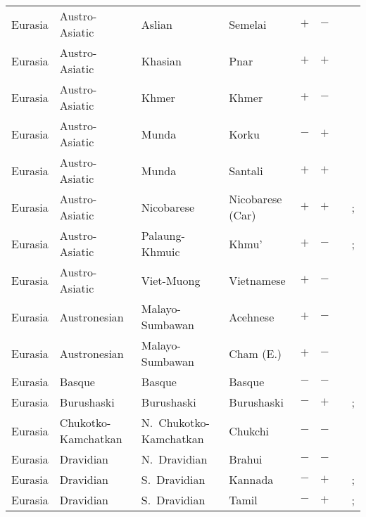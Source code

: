 \begin{landscape}
\begin{longtable}{l>{\raggedright\arraybackslash}p{2.2cm}>{\raggedright}p{2.5cm}>{\raggedright\arraybackslash}p{2.5cm}cc>{\raggedright\arraybackslash}p{3.4cm}>{\raggedright\arraybackslash}p{3.4cm}}
Eurasia & Austro-Asiatic & Aslian & Semelai & $+$ & $-$ & \citealt{Gil2013} & \citealt{Corbett2013}\\
Eurasia & Austro-Asiatic & Khasian & Pnar & $+$ & $+$ & \citealt[124--125, 357--369]{Ring2015} & \citealt[101, 107--108]{Ring2015}\\
Eurasia & Austro-Asiatic & Khmer & Khmer & $+$ & $-$ & \citealt{Gil2013} & \citealt{Corbett2013}\\
Eurasia & Austro-Asiatic & Munda & Korku & $-$ & $+$ & \citealt{Gil2013} & \citealt[passim]{Bhattacharya1976}\\
Eurasia & Austro-Asiatic & Munda & Santali & $+$ & $+$ & \citealt{Gil2013} & \citealt[11--12, 32--33, 39--40, 44--45]{Ghosh2008}\\
Eurasia & Austro-Asiatic & Nicobarese & Nicobarese (Car) & $+$ & $+$ & \citealt{Gil2013} & \citealt{Corbett2013}; \citealt[103--108]{Braine1970}\\
Eurasia & Austro-Asiatic & Palaung-Khmuic & Khmu' & $+$ & $-$ & \citealt{Gil2013} & \citealt{Corbett2013}; \citealt[30, 32--33]{Premsrirat1987}\\
Eurasia & Austro-Asiatic & Viet-Muong & Vietnamese & $+$ & $-$ & \citealt{Gil2013} & \citealt{Corbett2013}\\
Eurasia & Austronesian & Malayo-Sumbawan & Acehnese & $+$ & $-$ & \citealt[137--139]{Durie1985}& \citealt[29]{Durie1985}\\
Eurasia & Austronesian & Malayo-Sumbawan & Cham (E.) & $+$ & $-$ & \citealt{Gil2013} & \citealt[passim]{Thurgood2005}\\
Eurasia & Basque & Basque & Basque & $-$ & $-$ & \citealt{Gil2013} & \citealt{Corbett2013}\\
Eurasia & Burushaski & Burushaski & Burushaski & $-$ & $+$ & \citealt{Gil2013} & \citealt{Corbett2013}; \citealt[161--167]{Munshi2006}\\
Eurasia & Chukotko-Kamchatkan & N.~Chukotko-Kamchatkan & Chukchi & $-$ & $-$ & \citealt{Gil2013} & \citealt{Corbett2013}\\
Eurasia & Dravidian & N.~Dravidian & Brahui & $-$ & $-$ & \citealt{Gil2013} & \citealt{Corbett2013}\\
Eurasia & Dravidian & S.~Dravidian & Kannada & $-$ & $+$ & \citealt{Gil2013} & \citealt{Corbett2013}; \citealt[221--222]{Sridhar1990}\\
Eurasia & Dravidian & S.~Dravidian & Tamil & $-$ & $+$ & \citealt[48--50]{Schiffman1999}& \citealt{Corbett2013}; \citealt[57--58]{Schiffman1999}\\

\end{longtable}
\end{landscape}
